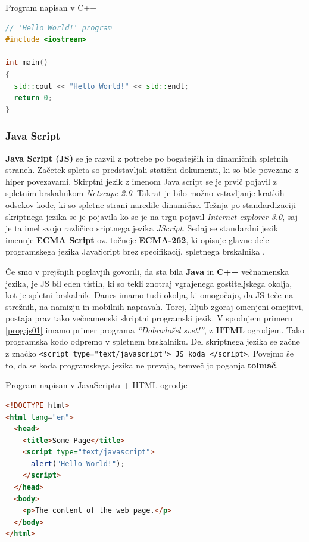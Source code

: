 \begin{examplebox}[label={prog:cpp01}]{Program napisan v C++}
\begin{lstlisting}[language=C++]
// 'Hello World!' program
#include <iostream>

int main()
{
  std::cout << "Hello World!" << std::endl;
  return 0;
}
\end{lstlisting}
\end{examplebox}

\subsubsection{Java Script}
\label{sec:pj_JS}

\textbf{Java Script (JS)} se je razvil z potrebe po bogatejših in dinamičnih
spletnih straneh. Začetek spleta so predstavljali statični dokumenti,
ki so bile povezane z hiper povezavami. Skirptni jezik z imenom Java
script se je prvič pojavil z spletnim brskalnikom \emph{Netscape
  2.0}. Takrat je bilo možno vstavljanje kratkih odsekov kode, ki so
spletne strani naredile dinamične. Težnja po standardizaciji
skriptnega jezika se je pojavila ko se je na trgu pojavil
\emph{Internet explorer 3.0}, saj je ta imel svojo različico sriptnega
jezika \emph{JScript}. Sedaj se standardni jezik imenuje \textbf{ECMA
  Script} oz. točneje \textbf{ECMA-262}, ki opisuje glavne dele
programskega jezika JavaScript brez specifikacij, spletnega
brskalnika \cite{OO-JS}.

Če smo v prejšnjih poglavjih govorili, da sta bila \textbf{Java} in
\textbf{C++} večnamenska jezika, je JS bil eden tistih, ki so tekli
znotraj vgrajenega gostiteljskega okolja, kot je spletni
brskalnik. Danes imamo tudi okolja, ki omogočajo, da JS teče na
strežnih, na namizju in mobilnih napravah. Torej, kljub zgoraj
omenjeni omejitvi, postaja prav tako večnamenski skriptni programski
jezik. V spodnjem primeru \ref{prog:js01} imamo primer programa
\emph{``Dobrodošel svet!''}, z \textbf{HTML} ogrodjem. Tako programska
kodo odpremo v spletnem brskalniku. Del skriptnega jezika se začne z
značko \texttt{<script type="text/javascript"> JS koda
  </script>}. Povejmo še to, da se koda programskega jezika ne
prevaja, temveč jo poganja \textbf{tolmač}.


\begin{examplebox}[label={prog:js01}]{Program napisan v JavaScriptu +
    HTML ogrodje}
\begin{lstlisting}[language=Html]
<!DOCTYPE html>
<html lang="en">
  <head>
    <title>Some Page</title>
    <script type="text/javascript">
      alert("Hello World!");
    </script>
  </head>
  <body>
    <p>The content of the web page.</p>
  </body>
</html>
\end{lstlisting}
\end{examplebox}

